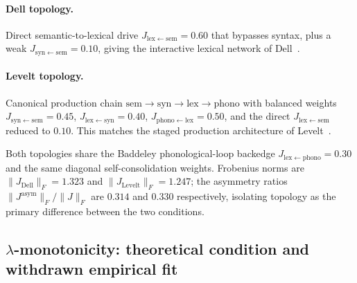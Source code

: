 \documentclass[11pt]{article}
\begin{document}
\paragraph{Dell topology.}
Direct semantic-to-lexical drive
$J_{\mathrm{lex}\leftarrow\mathrm{sem}} = 0.60$ that bypasses syntax,
plus a weak $J_{\mathrm{syn}\leftarrow\mathrm{sem}} = 0.10$, giving the
interactive lexical network of Dell~\cite{dell1986}.

\paragraph{Levelt topology.}
Canonical production chain $\mathrm{sem} \to \mathrm{syn}
\to \mathrm{lex} \to \mathrm{phono}$ with balanced weights
$J_{\mathrm{syn}\leftarrow\mathrm{sem}} = 0.45$,
$J_{\mathrm{lex}\leftarrow\mathrm{syn}} = 0.40$,
$J_{\mathrm{phono}\leftarrow\mathrm{lex}} = 0.50$, and the direct
$J_{\mathrm{lex}\leftarrow\mathrm{sem}}$ reduced to $0.10$. This
matches the staged production architecture of
Levelt~\cite{levelt1999}.

Both topologies share the Baddeley phonological-loop backedge
$J_{\mathrm{lex}\leftarrow\mathrm{phono}} = 0.30$ and the same diagonal
self-consolidation weights. Frobenius norms are
$\|J_{\mathrm{Dell}}\|_F = 1.323$ and $\|J_{\mathrm{Levelt}}\|_F = 1.247$;
the asymmetry ratios $\|J^{\mathrm{asym}}\|_F / \|J\|_F$ are $0.314$
and $0.330$ respectively, isolating topology as the primary
difference between the two conditions.

\subsection{\texorpdfstring{$\lambda$}{lambda}-monotonicity: theoretical condition and withdrawn empirical fit}
\label{sec:lambda-mono}
\end{document}
